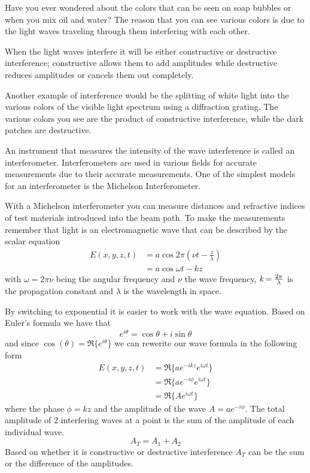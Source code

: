 	Have you ever wondered about the colors that can be seen on soap bubbles or when you mix oil and water? The reason that you can see various colors is due to the light waves traveling through them interfering with each other. 

	When the light waves interfere it will be either constructive or destructive interference; constructive allows them to add amplitudes while destructive reduces amplitudes or cancels them out completely.

	Another example of interference would be the splitting of white light into the various colors of the visible light spectrum using a diffraction grating. The various colors you see are the product of constructive interference, while the dark patches are destructive.

    An instrument that measures the intensity of the wave interference is called an interferometer. Interferometers are used in various fields for accurate measurements due to their accurate measurements. One of the simplest models for an interferometer is the Michelson Interferometer.

	With a Michelson interferometer you can measure distances and refractive indices of test materials introduced into the beam path. To make the measurements remember that light is an electromagnetic wave that can be described by the scalar equation
	\begin{align}\label{eqn:EMWave}
		\nonumber E(x,y,z,t) &= a\cos{2\pi(\nu t-\frac{z}{\lambda})} \\
		&= a\cos{\omega t-kz}
	\end{align}
with $\omega=2\pi\nu$ being the angular frequency and $\nu$ the wave frequency, $\emph{k}=\frac{2\pi}{\lambda}$ is the propagation constant and $\lambda$ is the wavelength in space.  

	By switching to exponential it is easier to work with the wave equation. Based on Euler’s formula we have that 
	\begin{equation}\label{eqn:Euler's}
		e^{i\theta} = \cos{\theta} + i \sin{\theta}
	\end{equation}
and since $\cos(\theta)=\Re\{e^{i\theta}\}$ we can rewerite our wave formula in the following form
	\begin{align}\label{eqn:TrigEMWave}
		\nonumber E(x,y,z,t) &=\Re\{a e^{-ikz} e^{i\omega t}\} \\
		\nonumber &=\Re\{a e^{-i\phi} e^{i\omega t}\} \\
		&=\Re\{A e^{i\omega t}\}
	\end{align}
where the phase $\phi=kz$ and the amplitude of the wave $A=ae^{-i\phi}$. The total amplitude of 2 interfering waves at a point is the sum of the amplitude of each individual wave.
	\begin{equation}\label{eqn:Amplitude}
		A_{T}=A_{1}+A_{2}
	\end{equation}
Based on whether it is constructive or destructive interference $A_T$ can be the sum or the difference of the amplitudes. 

